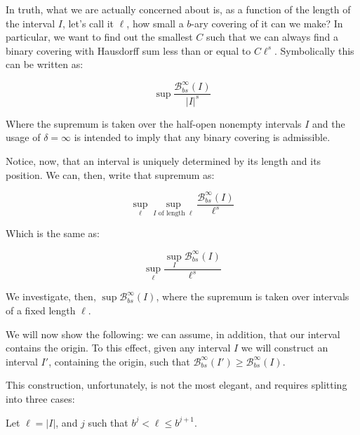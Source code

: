 \documentclass[11pt]{amsart}
\newcommand{\BB}{\mathcal{B}}
\begin{document}
In truth, what we are actually concerned about is, as a function of the length of the interval $I$, let's call it $\ell$, how small a $b$-ary covering of it can we make? In particular, we want to find out the smallest $C$ such that we can always find a binary covering with Hausdorff sum less than or equal to $C \ell^s$. Symbolically this can be written as:

\[\sup \frac{\BB_{bs}^\infty(I)}{\lvert I \rvert^s}\]

Where the supremum is taken over the half-open nonempty intervals $I$ and the usage of $\delta = \infty$ is intended to imply that any binary covering is admissible.

Notice, now, that an interval is uniquely determined by its length and its position. We can, then, write that supremum as:

\[\sup_\ell \sup_\text{$I$ of length $\ell$} \frac{\BB_{bs}^\infty(I)}{\ell^s}\]

Which is the same as:

\[\sup_\ell \frac{\sup_I \BB_{bs}^\infty(I)}{\ell^s}\]

We investigate, then, $\sup \BB_{bs}^\infty(I)$, where the supremum is taken over intervals of a fixed length $\ell$.

We will now show the following: we can assume, in addition, that our interval contains the origin. To this effect, given any interval $I$ we will construct an interval $I'$, containing the origin, such that $\BB_{bs}^\infty(I') \geq \BB_{bs}^\infty(I)$.

This construction, unfortunately, is not the most elegant, and requires splitting into three cases:

Let $\ell = \lvert I \rvert$, and $j$ such that $b^j < \ell \leq b^{j+1}$.
\end{document}

